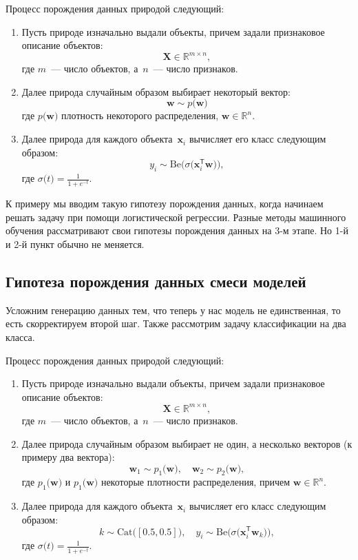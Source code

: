\documentclass[12pt, twoside]{article}
\numberwithin{equation}{section}
\begin{document}
Процесс порождения данных природой следующий:
\begin{enumerate}
	\item Пусть природе изначально выдали объекты, причем задали признаковое описание объектов:
\[
\mathbf{X} \in \mathbb{R}^{m\times n},
\]
где $m$~--- число объектов, а~$n$~--- число признаков.

	\item Далее природа случайным образом выбирает некоторый вектор:
\[
\mathbf{w} \sim p\bigr(\mathbf{w}\bigr)
\]
где $p\bigr(\mathbf{w}\bigr)$ плотность некоторого распределения, $\mathbf{w}\in \mathbb{R}^{n}$.

	\item Далее природа для каждого объекта~$\mathbf{x}_i$ вычисляет его класс следующим образом:
	\[
	y_i \sim \text{Be}\bigr(\sigma\bigr(\mathbf{x}_i^{\mathsf{T}}\mathbf{w}\bigr)\bigr),
	\]
	где $\sigma\bigr(t\bigr) = \frac{1}{1+e^{-t}}$.
\end{enumerate}

К примеру мы вводим такую гипотезу порождения данных, когда начинаем решать задачу при помощи логистической регрессии. Разные методы машинного обучения рассматривают свои гипотезы порождения данных на 3-м этапе. Но 1-й и 2-й пункт обычно не меняется.

\subsection{Гипотеза порождения данных смеси моделей}
Усложним генерацию данных тем, что теперь у нас модель не единственная, то есть скорректируем второй шаг. Также рассмотрим задачу классификации на два класса.

Процесс порождения данных природой следующий:
\begin{enumerate}
	\item Пусть природе изначально выдали объекты, причем задали признаковое описание объектов:
\[
\mathbf{X} \in \mathbb{R}^{m\times n},
\]
где $m$~--- число объектов, а~$n$~--- число признаков.

	\item Далее природа случайным образом выбирает не один, а несколько векторов (к примеру два вектора):
\[
\mathbf{w}_1 \sim p_1\bigr(\mathbf{w}\bigr), \quad \mathbf{w}_2 \sim p_2\bigr(\mathbf{w}\bigr),
\]
где $p_1\bigr(\mathbf{w}\bigr)$ и $p_1\bigr(\mathbf{w}\bigr)$ некоторые плотности распределения, причем $\mathbf{w}\in \mathbb{R}^{n}$.

	\item Далее природа для каждого объекта~$\mathbf{x}_i$ вычисляет его класс следующим образом:
	\[
	k \sim \text{Cat}\bigr([0.5, 0.5]\bigr), \quad y_i \sim \text{Be}\bigr(\sigma\bigr(\mathbf{x}_i^{\mathsf{T}}\mathbf{w}_k\bigr)\bigr),
	\]
	где $\sigma\bigr(t\bigr) = \frac{1}{1+e^{-t}}$.
\end{enumerate}
\end{document}

